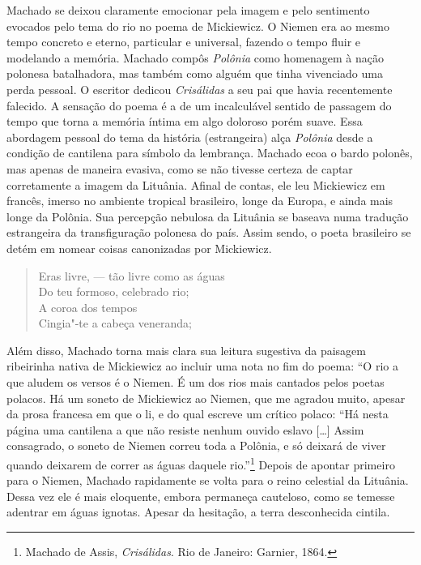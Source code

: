 Machado se deixou claramente emocionar pela imagem e pelo sentimento
evocados pelo tema do rio no poema de Mickiewicz. O Niemen era ao mesmo
tempo concreto e eterno, particular e universal, fazendo o tempo fluir e
modelando a memória. Machado compôs \textit{Polônia} como homenagem à
nação polonesa batalhadora, mas também como alguém que tinha vivenciado
uma perda pessoal. O escritor dedicou \textit{Crisálidas} a seu pai que
havia recentemente falecido. A sensação do poema é a de um incalculável
sentido de passagem do tempo que torna a memória íntima em algo doloroso
porém suave. Essa abordagem pessoal do tema da história (estrangeira)
alça \textit{Polônia} desde a condição de cantilena para símbolo da
lembrança. Machado ecoa o bardo polonês, mas apenas de maneira evasiva,
como se não tivesse certeza de captar corretamente a imagem da Lituânia.
Afinal de contas, ele leu Mickiewicz em francês, imerso no ambiente
tropical brasileiro, longe da Europa, e ainda mais longe da Polônia. Sua
percepção nebulosa da Lituânia se baseava numa tradução estrangeira da
transfiguração polonesa do país. Assim sendo, o poeta brasileiro se
detém em nomear coisas canonizadas por Mickiewicz.

\begin{verse}
Eras livre, --- tão livre como as águas \\
Do teu formoso, celebrado rio;\\
A coroa dos tempos\\
Cingia"-te a cabeça veneranda;
\end{verse}

Além disso, Machado torna mais clara sua leitura sugestiva da paisagem
ribeirinha nativa de Mickiewicz ao incluir uma nota no fim do poema: ``O
rio a que aludem os versos é o Niemen. É um dos rios mais cantados pelos
poetas polacos. Há um soneto de Mickiewicz ao Niemen, que me agradou
muito, apesar da prosa francesa em que o li, e do qual escreve um
crítico polaco: ``Há nesta página uma cantilena a que não resiste nenhum
ouvido eslavo {[}\ldots{}{]} Assim consagrado, o soneto de Niemen correu
toda a Polônia, e só deixará de viver quando deixarem de correr as águas
daquele rio.''\footnote{Machado de Assis, \textit{Crisálidas}. Rio de Janeiro: Garnier, 1864.} Depois de apontar primeiro para o Niemen,
Machado rapidamente se volta para o reino celestial da Lituânia. Dessa
vez ele é mais eloquente, embora permaneça cauteloso, como se temesse
adentrar em águas ignotas. Apesar da hesitação, a terra desconhecida
cintila.


